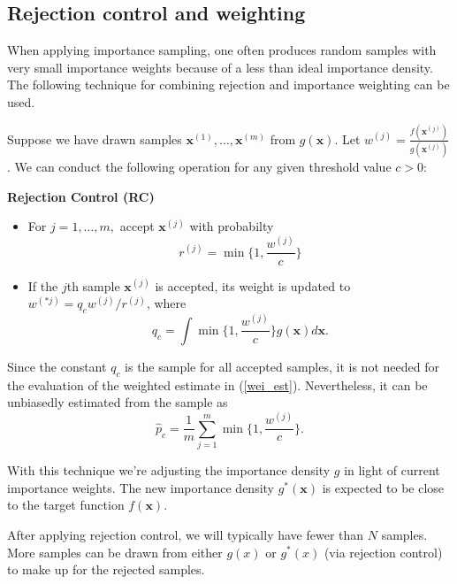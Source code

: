 \documentclass[times, utf8, diplomski]{fer}
\begin{document}
\subsection{Rejection control and weighting}
When applying importance sampling, one often produces random samples with very small importance weights because of a less than ideal importance density. The following technique for combining rejection and importance weighting can be used. 

Suppose we have drawn samples $\mathbf{x}^{(1)}, \ldots, \mathbf{x}^{(m)}$ from $g(\mathbf{x})$. Let $w^{(j)} =  \frac{f(\mathbf{x}^{(j)})}{g(\mathbf{x}^{(j)})}$. We can conduct the following operation for any given threshold value $c > 0$:

\label{RC}
\textbf{Rejection Control (RC)}
\begin{itemize}
\item{For $j = 1, \ldots, m,$ accept $\mathbf{x}^{(j)}$ with probabilty 
\begin{equation*}
r^{(j)} =  \min  \Big \{ {1, \frac{w^{(j)}}{c}} \Big \}
\end{equation*}}
\item{If the $j$th sample $\mathbf{x}^{(j)}$ is accepted, its weight is updated to $w^{(*j)} = q_c w^{(j)} / r^{(j)}$, where 
\begin{equation*}
q_c = \int \min  \Big \{ {1, \frac{w^{(j)}}{c}} \Big \} g(\mathbf{x}) d\mathbf{x}.
\end{equation*}
}
\end{itemize}

Since the constant $q_c$ is the sample for all accepted samples, it is not needed for the  evaluation of the weighted estimate in (\ref{wei_est}). Nevertheless, it can be unbiasedly estimated \cite{Liu} from the sample as 
\begin{equation*}
\hat{p}_{c} = \frac{1}{m} \sum_{j = 1}^{m} \min  \Big \{ {1, \frac{w^{(j)}}{c}} \Big \}.
\end{equation*}

With this technique we're adjusting the importance density $g$  in light of current importance weights. The new importance density $g^{*}(\mathbf{x})$ is expected to be close to the target function $f(\mathbf{x})$.


After applying rejection control, we will typically have fewer than $N$ samples. More samples can be drawn from either $g(x)$ or $g^{*}(x)$ (via rejection control) to make up for the rejected samples. 
\end{document}
